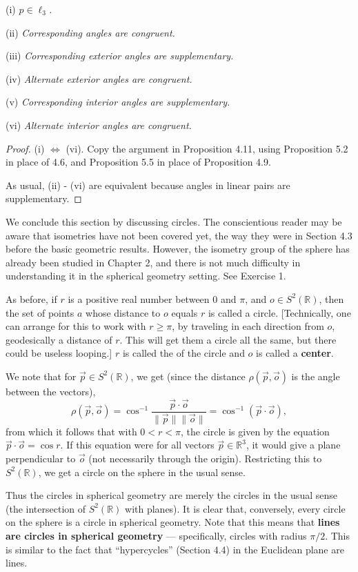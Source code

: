 \documentclass[leqno]{book}
\begin{document}
(i) \emph{$p\in\ell_3$.}

(ii) \emph{Corresponding angles are congruent.}

(iii) \emph{Corresponding exterior angles are supplementary.}

(iv) \emph{Alternate exterior angles are congruent.}

(v) \emph{Corresponding interior angles are supplementary.}

(vi) \emph{Alternate interior angles are congruent.}
\begin{proof}
(i) $\iff$ (vi). Copy the argument in Proposition 4.11, using Proposition 5.2 in place of 4.6, and Proposition 5.5 in place of Proposition 4.9.

As usual, (ii) - (vi) are equivalent because angles in linear pairs are supplementary.
\end{proof}

\noindent We conclude this section by discussing circles.  The conscientious reader may be aware that isometries have not been covered yet, the way they were in Section 4.3 before the basic geometric results.  However, the isometry group of the sphere has already been studied in Chapter 2, and there is not much difficulty in understanding it in the spherical geometry setting.  See Exercise 1.

As before, if $r$ is a positive real number between $0$ and $\pi$, and $o\in S^2(\mathbb R)$, then the set of points $a$ whose distance to $o$ equals $r$ is called a circle.  [Technically, one can arrange for this to work with $r\geqslant\pi$, by traveling in each direction from $o$, geodesically a distance of $r$.  This will get them a circle all the same, but there could be useless looping.]  $r$ is called the  of the circle and $o$ is called a \textbf{center}.

We note that for $\vec p\in S^2(\mathbb R)$, we get (since the distance $\rho(\vec p,\vec o)$ is the angle between the vectors),
$$\rho(\vec p,\vec o)=\cos^{-1}\frac{\vec p\cdot\vec o}{\|\vec p\|\|\vec o\|}=\cos^{-1}(\vec p\cdot\vec o),$$
from which it follows that with $0<r<\pi$, the circle is given by the equation $\vec p\cdot\vec o=\cos r$.  If this equation were for all vectors $\vec p\in\mathbb R^3$, it would give a plane perpendicular to $\vec o$ (not necessarily through the origin).  Restricting this to $S^2(\mathbb R)$, we get a circle on the sphere in the usual sense.

Thus the circles in spherical geometry are merely the circles in the usual sense (the intersection of $S^2(\mathbb R)$ with planes).  It is clear that, conversely, every circle on the sphere is a circle in spherical geometry.  Note that this means that \textbf{lines are circles in spherical geometry} \---- specifically, circles with radius $\pi/2$.  This is similar to the fact that ``hypercycles'' (Section 4.4) in the Euclidean plane are lines.
\end{document}

